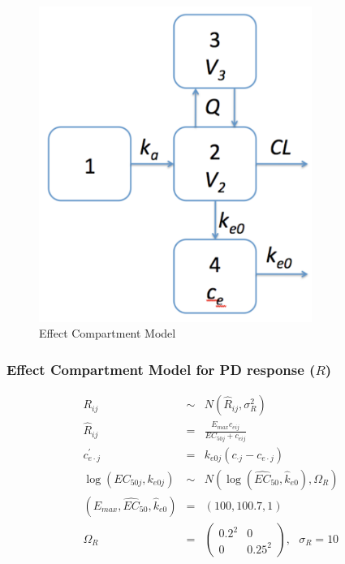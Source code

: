 \documentclass[11pt]{amsart}
\begin{document}
\begin{figure}[htbp]
\includegraphics[width=3.5in,trim=0in 0in 0 0in]{graphics/effectCptModel.pdf}
\caption{Effect Compartment Model}
\label{effCptModel}
\end{figure}

\subsubsection*{Effect Compartment Model for PD response ($R$)}
\begin{eqnarray*}
R_{ij} &\sim& N\left(\widehat{R}_{ij},\sigma_{R}^2\right) \\
\widehat{R}_{ij} &=& \frac{E_{max}c_{eij}}{EC_{50j} + c_{eij}} \\
c_{e\cdot j}^\prime &=& k_{e0j}\left(c_{\cdot j} - c_{e\cdot j}\right) \\
\log\left(EC_{50j}, k_{e0j}\right) &\sim& N\left(\log\left(\widehat{EC}_{50}, \widehat{k}_{e0}\right),\Omega_R\right) \\
\left(E_{max}, \widehat{EC}_{50},\widehat{k}_{e0}\right) &=& \left(100, 100.7, 1\right) \\
\Omega_R &=& \left(\begin{array}{cc} 0.2^2 & 0 \\ 0 & 0.25^2  \end{array}\right), \ \ \ \sigma_R = 10
\end{eqnarray*}
\end{document}
